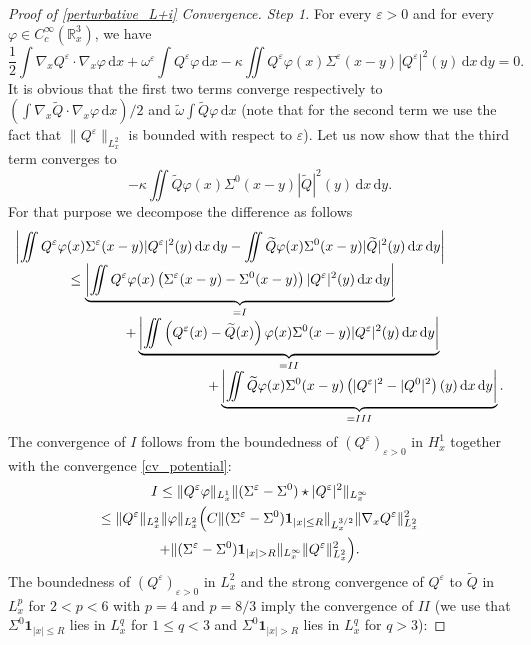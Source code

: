 \documentclass[11pt]{article}
\theoremstyle{definition}
\newenvironment{ProofOf}[1]{\begin{proof}[Proof of #1]}{\end{proof}}
\newcommand{\R}{\mathbb{R}}
\let\ds\displaystyle
\newcommand{\ud}{\, {\mathrm{d}}}
\begin{document}
\begin{ProofOf}{\eqref{perturbative_L+i} Convergence. Step 1}
For every $\varepsilon>0$ and for every $\varphi\in C_{c}^{\infty}(\R_{x}^{3})$, we have
\[
\frac{1}{2}\int\nabla_{x}Q^{\varepsilon}\cdot\nabla_{x}\varphi\ud x+\omega^{\varepsilon}\int Q^{\varepsilon}\varphi\ud x-\kappa\iint Q^{\varepsilon}\varphi(x)\Sigma^{\varepsilon}(x-y)|Q^{\varepsilon}|^{2}(y)\ud x\ud y=0.
\]
It is obvious that the first two terms converge respectively to $(\int\nabla_{x}\widetilde{Q}\cdot\nabla_{x}\varphi\ud x)/2$ and $\widetilde{\omega}\int\widetilde{Q}\varphi\ud x$ (note that for the second term we use the fact that $\|Q^{\varepsilon}\|_{L_{x}^{2}}$ is bounded with respect to $\varepsilon$). Let us now show that the third term converges to
\[
-\kappa\iint\widetilde{Q}\varphi(x)\Sigma^{0}(x-y)|\widetilde{Q}|^{2}(y)\ud x\ud y.
\]
For that purpose we decompose the difference as follows
\[
\begin{array}{l}
\ds \left|\iint Q^{\varepsilon}\varphi(x)\Sigma^{\varepsilon}(x-y)|Q^{\varepsilon}|^{2}(y)\ud x\ud y-\iint\widetilde{Q}\varphi(x)\Sigma^{0}(x-y)|\widetilde{Q}|^{2}(y)\ud x\ud y\right|\\
\ds\qquad\qquad \leq\underbrace{\left|\iint Q^{\varepsilon}\varphi(x)\left(\Sigma^{\varepsilon}(x-y)-\Sigma^{0}(x-y)\right)|Q^{\varepsilon}|^{2}(y)\ud x\ud y\right|}_{=\textup{I}}\\
\ds\qquad\qquad\qquad \qquad+\underbrace{\left|\iint \left(Q^{\varepsilon}(x)-\widetilde{Q}(x)\right)\varphi(x)\Sigma^{0}(x-y)|Q^{\varepsilon}|^{2}(y)\ud x\ud y\right|}_{=\textup{II}}\\
\ds\qquad\qquad\qquad \qquad\qquad\qquad \qquad +\underbrace{\biggl|\iint \widetilde{Q}\varphi(x)\Sigma^{0}(x-y)\left(|Q^{\varepsilon}|^{2}-|Q^{0}|^{2}\right)(y)\ud x\ud y\biggr|}_{=\textup{III}}.
\end{array}
\]
The convergence of $I$ follows from the boundedness of $(Q^{\varepsilon})_{\varepsilon>0}$ in $H_{x}^{1}$ together with the convergence \eqref{cv_potential}:
\begin{multline*}
\textup{I}\leq\|Q^{\varepsilon}\varphi\|_{L_{x}^{1}}\|(\Sigma^{\varepsilon}-\Sigma^{0})\star|Q^{\varepsilon}|^{2}\|_{L_{x}^{\infty}}\\
\leq\|Q^{\varepsilon}\|_{L_{x}^{2}}\|\varphi\|_{L_{x}^{2}}\Bigl(C\|(\Sigma^{\varepsilon}-\Sigma^{0})\mathbf{1}_{|x|\leq R}\|_{L_{x}^{3/2}}\|\nabla_{x}Q^{\varepsilon}\|_{L_{x}^{2}}^{2}
\\+\|(\Sigma^{\varepsilon}-\Sigma^{0})\mathbf{1}_{|x|>R}\|_{L_{x}^{\infty}}\|Q^{\varepsilon}\|_{L_{x}^{2}}^{2}\Bigr).
\end{multline*}
The boundedness of $(Q^{\varepsilon})_{\varepsilon>0}$ in $L_{x}^{2}$ and the strong convergence of $Q^{\varepsilon}$ to $\widetilde{Q}$ in $L_{x}^{p}$ for $2<p<6$ with $p=4$ and $p=8/3$ imply the convergence of $II$ (we use that $\Sigma^{0}\mathbf{1}_{|x|\leq R}$ lies in $L_{x}^{q}$ for $1\leq q<3$ and $\Sigma^{0}\mathbf{1}_{|x|>R}$ lies in $L_{x}^{q}$ for $q>3$):

\end{ProofOf}
\end{document}
